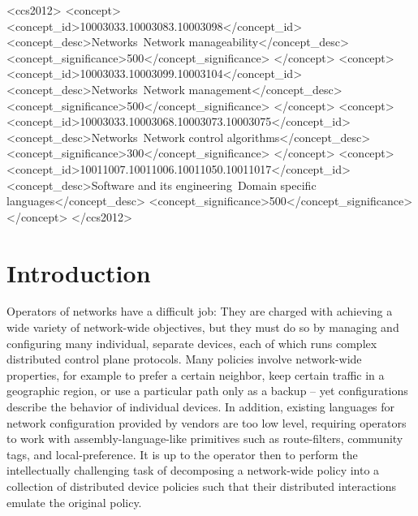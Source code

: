\documentclass[10pt]{sig-alternate}
\begin{document}
\begin{CCSXML}
<ccs2012>
<concept>
<concept_id>10003033.10003083.10003098</concept_id>
<concept_desc>Networks~Network manageability</concept_desc>
<concept_significance>500</concept_significance>
</concept>
<concept>
<concept_id>10003033.10003099.10003104</concept_id>
<concept_desc>Networks~Network management</concept_desc>
<concept_significance>500</concept_significance>
</concept>
<concept>
<concept_id>10003033.10003068.10003073.10003075</concept_id>
<concept_desc>Networks~Network control algorithms</concept_desc>
<concept_significance>300</concept_significance>
</concept>
<concept>
<concept_id>10011007.10011006.10011050.10011017</concept_id>
<concept_desc>Software and its engineering~Domain specific languages</concept_desc>
<concept_significance>500</concept_significance>
</concept>
</ccs2012>
\end{CCSXML}



%
%
%
%

\section{Introduction}
 
Operators of networks have a difficult job: They are charged
with achieving a wide variety of network-wide objectives, but they must do so by
managing and configuring many individual, separate devices, each of which runs
complex distributed control plane protocols. 
Many policies involve network-wide properties, for example to prefer a certain neighbor, keep certain traffic in a geographic region, or use a particular path only as a backup -- yet configurations describe the behavior of individual devices.
%
In addition, existing languages
for network configuration provided by vendors are too low level, requiring operators to work with assembly-language-like primitives such as route-filters, community tags, and local-preference. 
%
It is up to the operator then to perform the intellectually challenging task of decomposing a network-wide policy into a collection of distributed device policies such that their distributed interactions emulate the original policy.
\end{document}
